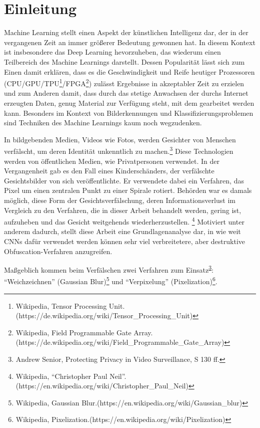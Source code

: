 \section{Einleitung}

Machine Learning stellt einen Aspekt der künstlichen Intelligenz dar, der in der vergangenen Zeit an immer größerer
Bedeutung gewonnen hat. In diesem Kontext ist insbesondere das Deep Learning hevorzuheben, das wiederum einen Teilbereich
des Machine Learnings darstellt. Dessen Popularität lässt sich zum Einen damit erklären, dass es die Geschwindigkeit und
Reife heutiger Prozessoren (CPU/GPU/TPU\footnote{Wikipedia, Tensor Processing Unit.\newline
(https://de.wikipedia.org/wiki/Tensor\_Processing\_Unit)}/FPGA\footnote{Wikipedia, Field Programmable Gate Array.\newline
(https://de.wikipedia.org/wiki/Field\_Programmable\_Gate\_Array)})
zulässt Ergebnisse in akzeptabler Zeit zu erzielen und zum Anderen damit, dass durch das stetige Anwachsen der durchs Internet
erzeugten Daten, genug Material zur Verfügung steht, mit dem gearbeitet werden kann. Besonders im Kontext von Bilderkennungen
und Klassifizierungsproblemen sind Techniken des Machine Learnings kaum noch wegzudenken.

In bildgebenden Medien, Videos wie Fotos, werden Gesichter von Menschen verfälscht, um deren Identität unkenntlich
zu machen.\footnote{Andrew Senior, Protecting Privacy in Video Surveillance, S 130 ff.\label{fn:protecting_privacy}}
Diese Technologien werden von
öffentlichen Medien, wie Privatpersonen verwendet. In der Vergangenheit
gab es den Fall eines Kinderschänders, der verfälschte Gesichtsbilder von sich veröffentlichte. Er verwendete dabei
ein Verfahren, das Pixel um einen zentralen Punkt zu einer Spirale rotiert. Behörden war es damals möglich, diese
Form der Gesichtsverfälschung, deren Informationsverlust im Vergleich zu den Verfahren, die in dieser Arbeit behandelt
werden, gering ist, aufzuheben und das Gesicht weitgehends wiederherzustellen.
\footnote{Wikipedia, ``Christopher Paul Neil''.\newline(https://en.wikipedia.org/wiki/Christopher\_Paul\_Neil)}
Motiviert unter anderem dadurch,
stellt diese Arbeit eine Grundlagenanalyse dar, in wie weit CNNs dafür verwendet werden können sehr viel verbreitetere,
aber destruktive Obfuscation-Verfahren anzugreifen.

Maßgeblich kommen beim Verfälschen zwei Verfahren zum Einsatz\textsuperscript{\ref{fn:protecting_privacy}}:
``Weichzeichnen'' (Gaussian Blur)\footnote{Wikipedia, Gaussian Blur.\newline(https://en.wikipedia.org/wiki/Gaussian\_blur)}
 und ``Verpixelung'' (Pixelization)\footnote{Wikipedia, Pixelization.\newline(https://en.wikipedia.org/wiki/Pixelization)\label{label:pixelization}}.


